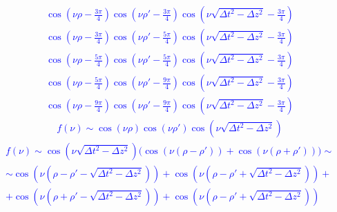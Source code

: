 %
\textcolor{blue} { \begin{equation*} \begin{aligned}
\cos \left( \nu \rho - \frac{3 \pi}{4} \right)
\cos \left( \nu \rho' - \frac{3 \pi}{4} \right)
\cos \left( \nu \sqrt{\Delta t^2 - \Delta z^2} - \frac{3\pi}{4} \right)
\end{aligned} \end{equation*} }
%
\textcolor{blue} { \begin{equation*} \begin{aligned}
\cos \left( \nu \rho - \frac{3 \pi}{4} \right)
\cos \left( \nu \rho' - \frac{5 \pi}{4} \right)
\cos \left( \nu \sqrt{\Delta t^2 - \Delta z^2} - \frac{3\pi}{4} \right)
\end{aligned} \end{equation*} }
%
\textcolor{blue} { \begin{equation*} \begin{aligned}
\cos \left( \nu \rho - \frac{5 \pi}{4} \right)
\cos \left( \nu \rho' - \frac{5 \pi}{4} \right)
\cos \left( \nu \sqrt{\Delta t^2 - \Delta z^2} - \frac{3\pi}{4} \right)
\end{aligned} \end{equation*} }
%
\textcolor{blue} { \begin{equation*} \begin{aligned}
\cos \left( \nu \rho - \frac{5 \pi}{4} \right)
\cos \left( \nu \rho' - \frac{9 \pi}{4} \right)
\cos \left( \nu \sqrt{\Delta t^2 - \Delta z^2} - \frac{3\pi}{4} \right)
\end{aligned} \end{equation*} }
%
\textcolor{blue} { \begin{equation*} \begin{aligned}
\cos \left( \nu \rho - \frac{9 \pi}{4} \right)
\cos \left( \nu \rho' - \frac{9 \pi}{4} \right)
\cos \left( \nu \sqrt{\Delta t^2 - \Delta z^2} - \frac{3\pi}{4} \right)
\end{aligned} \end{equation*} }
%
\textcolor{blue} { \begin{equation*} \begin{aligned}
f (\nu) \sim \cos \left( \nu \rho \right) \cos \left( \nu \rho' \right)
\cos \left( \nu \sqrt{\Delta t^2 - \Delta z^2} \right)
\end{aligned} \end{equation*} }
%
\textcolor{blue} { \begin{equation*} \begin{aligned}
f (\nu) \sim \cos \left( \nu \sqrt{\Delta t^2 - \Delta z^2} \right) \Big( 
\cos \left( \nu \left( \rho - \rho' \right) \right) +
\cos \left( \nu \left( \rho + \rho' \right) \right) \Big) \sim \\
\sim \cos \left( \nu \left( \rho - \rho' - 
\sqrt{\Delta t^2 - \Delta z^2} \right) \right) + 
\cos \left( \nu \left( \rho - \rho' + 
\sqrt{\Delta t^2 - \Delta z^2} \right) \right) + \\
+ \cos \left( \nu \left( \rho + \rho' - 
\sqrt{\Delta t^2 - \Delta z^2} \right) \right) +
\cos \left( \nu \left( \rho - \rho' + 
\sqrt{\Delta t^2 - \Delta z^2} \right) \right)
\end{aligned} \end{equation*} }
